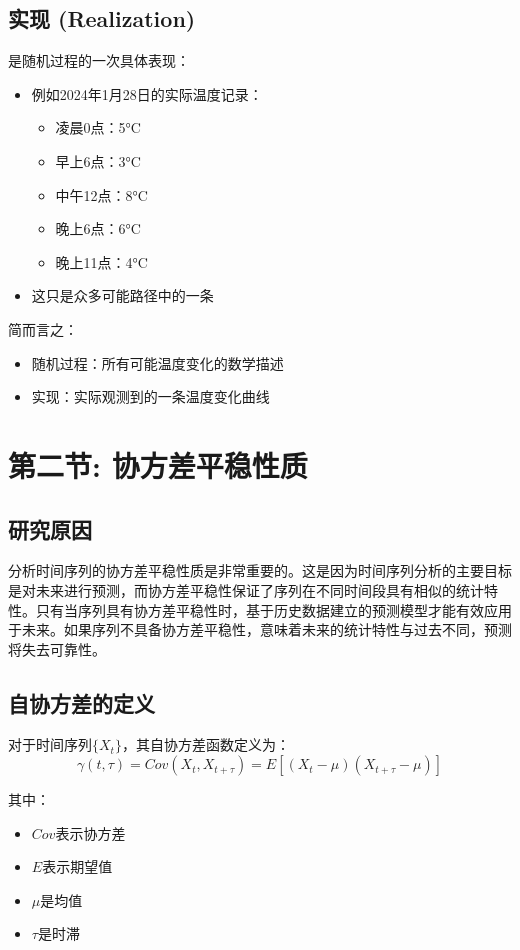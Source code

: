 \subsection*{实现 (Realization)}
是随机过程的一次具体表现：
\begin{itemize}
    \item 例如2024年1月28日的实际温度记录：
    \begin{itemize}
        \item 凌晨0点：5°C
        \item 早上6点：3°C
        \item 中午12点：8°C
        \item 晚上6点：6°C
        \item 晚上11点：4°C
    \end{itemize}
    \item 这只是众多可能路径中的一条
\end{itemize}

简而言之：
\begin{itemize}
    \item 随机过程：所有可能温度变化的数学描述
    \item 实现：实际观测到的一条温度变化曲线
\end{itemize}



\section{第二节: 协方差平稳性质}


\subsection{研究原因}
分析时间序列的协方差平稳性质是非常重要的。这是因为时间序列分析的主要目标是对未来进行预测，而协方差平稳性保证了序列在不同时间段具有相似的统计特性。只有当序列具有协方差平稳性时，基于历史数据建立的预测模型才能有效应用于未来。如果序列不具备协方差平稳性，意味着未来的统计特性与过去不同，预测将失去可靠性。


\subsection{自协方差的定义}
对于时间序列$\{X_t\}$，其自协方差函数定义为：
\begin{equation}
\gamma(t, \tau) = Cov(X_t, X_{t+\tau}) = E[(X_t - \mu)(X_{t+\tau} - \mu)]
\end{equation}

其中：
\begin{itemize}
    \item $Cov$表示协方差
    \item $E$表示期望值
    \item $\mu$是均值
    \item $\tau$是时滞
\end{itemize}


